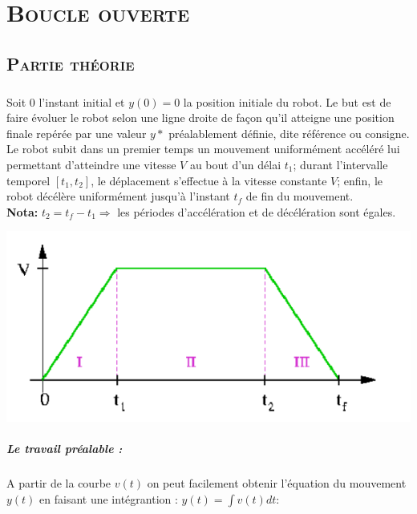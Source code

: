 \chapter{\textsc{Boucle ouverte}}

\section{\textsc{Partie théorie}}

	\paragraph{} Soit $0$ l’instant initial et $y(0) = 0$ la position initiale du robot. Le but est de faire évoluer le robot selon une ligne droite de façon qu’il atteigne une position finale repérée par une valeur $y*$ préalablement
définie, dite référence ou consigne. Le robot subit dans un premier temps un mouvement uniformément accéléré lui permettant d’atteindre une vitesse $V$ au bout d’un délai $t_1$; durant l’intervalle temporel $[t_1, t_2 ]$, le
déplacement s’effectue à la vitesse constante $V$; enfin, le robot décélère uniformément jusqu’à
l’instant $t_f$ de fin du mouvement.\\
\textbf{Nota:} $t_2=t_f-t_1 \Rightarrow$ les périodes d'accélération et de décélération sont égales.
	\begin{center}
	\includegraphics[scale=0.5]{vt.png}
	\label{fig2} 
	\end{center} 
	
	\paragraph{Le travail préalable :} A partir de la courbe $v(t)$ on peut facilement obtenir l'équation du mouvement $y(t)$ en faisant une intégrantion : $ y(t) = \int v(t)dt $:\\
	
